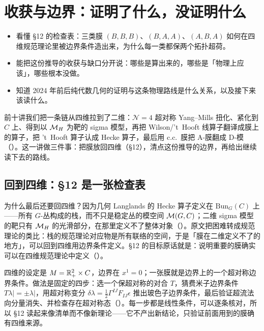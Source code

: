 
\section{收获与边界：证明了什么，没证明什么}
\label{sec:outlook}

\begin{goals}
\begin{itemize}
\item 看懂 \S12 的检查表：三类膜 $(B,B,B)$、$(B,A,A)$、$(A,B,A)$ 如何在四维规范理论里被边界条件造出来，为什么每一类都保两个拓扑超荷。
\item 能把这份推导的收获与缺口分开说：哪些是算出来的，哪些是「物理上应该」，哪些根本没做。
\item 知道 2024 年前后纯代数几何的证明与这条物理路线是什么关系，以及接下来该读什么。
\end{itemize}
\end{goals}

前十讲我们把一条链从四维拉到了二维：$\mathcal N=4$ 超对称 Yang--Mills 扭化、紧化到 $C$ 上、得到以 $\mathcal{M}_{H}$ 为靶的 sigma 模型，再把 Wilson/'t~Hooft 线算子翻译成膜上的算子，把 't~Hooft 算子认成 Hecke 算子，最后用 c.c.\ 膜把 A-膜翻成 D-模（\cite{kw06}）。这一讲做三件事：把膜放回四维（\S12），清点这份推导的边界，再给出继续读下去的路线。

\subsection{回到四维：\S12 是一张检查表}

为什么最后还要回四维？因为几何 Langlands 的 Hecke 算子定义在 $\mathrm{Bun}_G(C)$ 上——所有 $G$-丛构成的栈，而不只是稳定丛的模空间 $\mathcal{M}(G,C)$；二维 sigma 模型的靶只有 $\mathcal{M}_{H}$ 的光滑部分，在那里定义不了整体对象（）。原文把困难转成规范理论的类比：栈的规范理论对应物是所有联络的空间，于是「膜在二维定义不了的地方」，可以回到四维用边界条件定义。\S12 的目标原话就是：说明重要的膜确实可以在四维规范理论中定义（）。

四维的设定是 $M=\mathbb{R}^2_+\times C$，边界在 $x^1=0$；一张膜就是边界上的一个超对称边界条件。做法是固定的四步：选一个保超对称的对合 $T$，猜费米子边界条件 $T\lambda|=\pm\lambda|$，用超对称变分 $\delta\lambda=\tfrac12\Gamma^{IJ}F_{IJ}\epsilon$ 推出玻色子边界条件，最后验证超流法向分量消失、并检查存在超对称态（）。每一步都是线性条件，可以逐条核对，所以 \S12 读起来像清单而不像新理论——它不产出新结论，只验证前面用到的膜确有四维来源。

